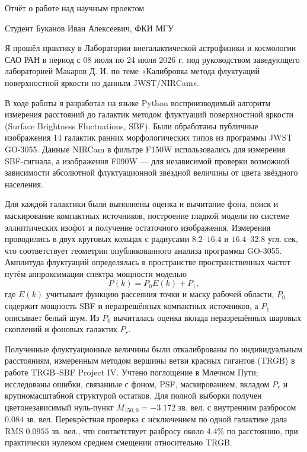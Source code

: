 \documentclass[11pt,letterpaper]{article}
\newcommand{\StudentFullName}{Буканов Иван Алексеевич}
\newcommand{\StudentAffiliation}{ФКИ МГУ}
\newcommand{\PracticeStart}{08 июля}
\newcommand{\PracticeEnd}{24 июля 2026 г.}
\newcommand{\SupervisorFullName}{Макаров Д. И.}
\newcommand{\ProjectTitle}{Калибровка метода флуктуаций поверхностной яркости по данным JWST/NIRCam}
\begin{document}
\begin{center}
  {\LARGE Отчёт о работе над научным проектом}
\end{center}

\vspace{6mm}

Студент \StudentFullName, \StudentAffiliation

\vspace{2mm}

Я прошёл практику в Лаборатории внегалактической астрофизики и космологии
САО РАН в период с \PracticeStart{} по \PracticeEnd{} под руководством
заведующего лабораторией \SupervisorFullName{} по теме
«\ProjectTitle».

В ходе работы я разработал на языке Python воспроизводимый алгоритм измерения
расстояний до галактик методом флуктуаций поверхностной яркости
(Surface Brightness Fluctuations, SBF). Были обработаны публичные изображения
14 галактик ранних морфологических типов из программы JWST GO-3055. Данные
NIRCam в фильтре F150W использовались для измерения SBF-сигнала, а изображения
F090W --- для независимой проверки возможной зависимости абсолютной
флуктуационной звёздной величины от цвета звёздного населения.

Для каждой галактики были выполнены оценка и вычитание фона, поиск и
маскирование компактных источников, построение гладкой модели по системе
эллиптических изофот и получение остаточного изображения. Измерения проводились
в двух круговых кольцах с радиусами $8.2$--$16.4$ и $16.4$--$32.8$ угл. сек,
что соответствует геометрии опубликованного анализа программы GO-3055.
Амплитуда флуктуаций определялась в пространстве пространственных частот
путём аппроксимации спектра мощности моделью
\[
  P(k)=P_0E(k)+P_1,
\]
где $E(k)$ учитывает функцию рассеяния точки и маску рабочей области,
$P_0$ содержит мощность SBF и неразрешённых компактных источников, а $P_1$
описывает белый шум. Из $P_0$ вычиталась оценка вклада неразрешённых шаровых
скоплений и фоновых галактик $P_r$.

Полученные флуктуационные величины были откалиброваны по индивидуальным
расстояниям, измеренным методом вершины ветви красных гигантов (TRGB) в работе
TRGB--SBF Project IV. Учтено поглощение в Млечном Пути; исследованы ошибки,
связанные с фоном, PSF, маскированием, вкладом $P_r$ и крупномасштабной
структурой остатков. Для полной выборки получен цветонезависимый нуль-пункт
$\overline{M}_{150,0}=-3.172$ зв. вел. с внутренним разбросом $0.084$ зв. вел.
Перекрёстная проверка с исключением по одной галактике дала RMS $0.0955$
зв. вел., что соответствует разбросу около $4.4\%$ по расстоянию, при
практически нулевом среднем смещении относительно TRGB.
\end{document}
